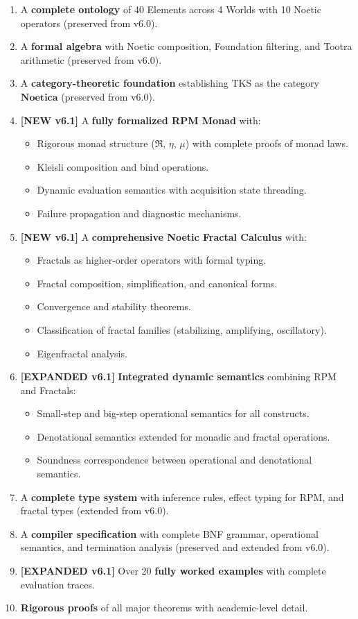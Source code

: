\documentclass[11pt,twoside,openright]{book}
\theoremstyle{definition}
\theoremstyle{plain}
\theoremstyle{remark}
\newcommand{\Noetica}{\mathbf{Noetica}}
\newcommand{\RPM}{\mathfrak{R}}
\begin{document}
\begin{enumerate}[label=(\arabic*)]
  \item A \textbf{complete ontology} of 40 Elements across 4 Worlds with 10 Noetic operators (preserved from v6.0).
  \item A \textbf{formal algebra} with Noetic composition, Foundation filtering, and Tootra arithmetic (preserved from v6.0).
  \item A \textbf{category-theoretic foundation} establishing TKS as the category $\Noetica$ (preserved from v6.0).
  \item \textbf{[NEW v6.1]} A \textbf{fully formalized RPM Monad} with:
    \begin{itemize}
      \item Rigorous monad structure ($\RPM$, $\eta$, $\mu$) with complete proofs of monad laws.
      \item Kleisli composition and bind operations.
      \item Dynamic evaluation semantics with acquisition state threading.
      \item Failure propagation and diagnostic mechanisms.
    \end{itemize}
  \item \textbf{[NEW v6.1]} A \textbf{comprehensive Noetic Fractal Calculus} with:
    \begin{itemize}
      \item Fractals as higher-order operators with formal typing.
      \item Fractal composition, simplification, and canonical forms.
      \item Convergence and stability theorems.
      \item Classification of fractal families (stabilizing, amplifying, oscillatory).
      \item Eigenfractal analysis.
    \end{itemize}
  \item \textbf{[EXPANDED v6.1]} \textbf{Integrated dynamic semantics} combining RPM and Fractals:
    \begin{itemize}
      \item Small-step and big-step operational semantics for all constructs.
      \item Denotational semantics extended for monadic and fractal operations.
      \item Soundness correspondence between operational and denotational semantics.
    \end{itemize}
  \item A \textbf{complete type system} with inference rules, effect typing for RPM, and fractal types (extended from v6.0).
  \item A \textbf{compiler specification} with complete BNF grammar, operational semantics, and termination analysis (preserved and extended from v6.0).
  \item \textbf{[EXPANDED v6.1]} Over 20 \textbf{fully worked examples} with complete evaluation traces.
  \item \textbf{Rigorous proofs} of all major theorems with academic-level detail.
\end{enumerate}
\end{document}
